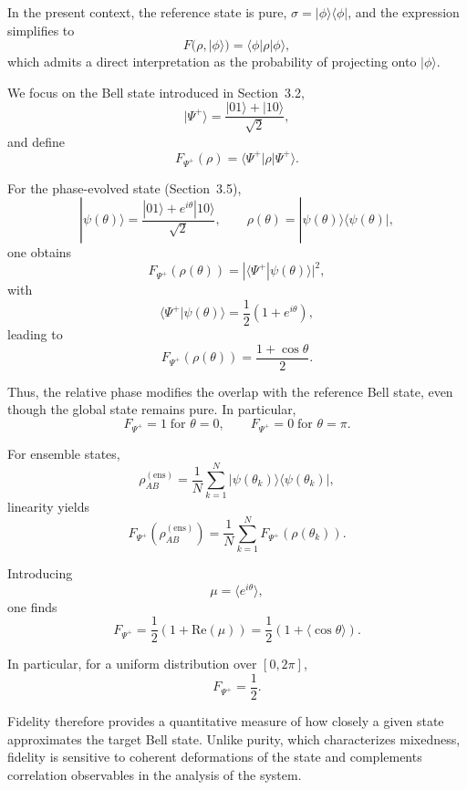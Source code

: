 \documentclass[a4paper]{article}
\begin{document}
\medskip

In the present context, the reference state is pure, \( \sigma = |\phi\rangle\langle\phi| \), and the expression simplifies to
\[
F(\rho, |\phi\rangle)
=
\langle \phi | \rho | \phi \rangle,
\]
which admits a direct interpretation as the probability of projecting onto \( |\phi\rangle \).

\medskip

We focus on the Bell state introduced in Section~3.2,
\[
|\Psi^+\rangle = \frac{|01\rangle + |10\rangle}{\sqrt{2}},
\]
and define
\[
F_{\Psi^+}(\rho)
=
\langle \Psi^+ | \rho | \Psi^+ \rangle.
\]

\medskip

For the phase-evolved state (Section~3.5),
\[
|\psi(\theta)\rangle = \frac{|01\rangle + e^{i\theta}|10\rangle}{\sqrt{2}},
\qquad
\rho(\theta) = |\psi(\theta)\rangle\langle\psi(\theta)|,
\]
one obtains
\[
F_{\Psi^+}(\rho(\theta))
=
|\langle \Psi^+ | \psi(\theta) \rangle|^2,
\]
with
\[
\langle \Psi^+ | \psi(\theta) \rangle
=
\frac{1}{2}(1 + e^{i\theta}),
\]
leading to
\[
F_{\Psi^+}(\rho(\theta))
=
\frac{1 + \cos\theta}{2}.
\]

\medskip

Thus, the relative phase modifies the overlap with the reference Bell state, even though the global state remains pure. In particular,
\[
F_{\Psi^+} = 1 \;\text{for } \theta = 0,
\qquad
F_{\Psi^+} = 0 \;\text{for } \theta = \pi.
\]

\medskip

For ensemble states,
\[
\rho_{AB}^{(\mathrm{ens})}
=
\frac{1}{N}\sum_{k=1}^{N}
|\psi(\theta_k)\rangle\langle\psi(\theta_k)|,
\]
linearity yields
\[
F_{\Psi^+}(\rho_{AB}^{(\mathrm{ens})})
=
\frac{1}{N}
\sum_{k=1}^{N}
F_{\Psi^+}(\rho(\theta_k)).
\]

Introducing
\[
\mu = \langle e^{i\theta} \rangle,
\]
one finds
\[
F_{\Psi^+}
=
\frac{1}{2}\left(1 + \mathrm{Re}(\mu)\right)
=
\frac{1}{2}\left(1 + \langle \cos\theta \rangle\right).
\]

\medskip

In particular, for a uniform distribution over \( [0,2\pi] \),
\[
F_{\Psi^+} = \frac{1}{2}.
\]

\medskip

Fidelity therefore provides a quantitative measure of how closely a given state approximates the target Bell state. Unlike purity, which characterizes mixedness, fidelity is sensitive to coherent deformations of the state and complements correlation observables in the analysis of the system.
\end{document}
